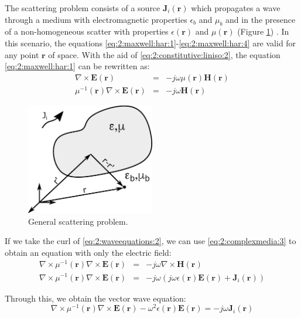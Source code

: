 		The scattering problem consists of a source $\mathbf{J}_i(\mathbf{r})$ which propagates a wave through a medium with electromagnetic properties $\epsilon_b$ and $\mu_b$ and in the presence of a non-homogeneous scatter with properties $\epsilon(\mathbf{r})$ and $\mu(\mathbf{r})$ (Figure \ref{fig:2:scattering}) \citep{chew1995}. In this scenario, the equations \eqref{eq:2:maxwell:har:1}-\eqref{eq:2:maxwell:har:4} are valid for any point $\mathbf{r}$ of space. With the aid of \eqref{eq:2:constitutive:liniso:2}, the equation \eqref{eq:2:maxwell:har:1} can be rewritten as:
		\begin{eqnarray}
				\nabla\times\mathbf{E}(\mathbf{r}) &=& - j\omega\mu(\mathbf{r})\mathbf{H}(\mathbf{r}) \label{eq:2:waveequations:1} \\
				\mu^{-1}(\mathbf{r})\nabla\times\mathbf{E}(\mathbf{r}) &=& - j\omega\mathbf{H}(\mathbf{r}) \label{eq:2:waveequations:2} 
		\end{eqnarray}
	
	    \begin{figure}[!tb]
			\centering
			\includegraphics[width=0.5\textwidth]{./figuras/scattering}
			\caption{General scattering problem.}
			\label{fig:2:scattering}
		\end{figure}
	
		If we take the curl of \eqref{eq:2:waveequations:2}, we can use \eqref{eq:2:complexmedia:3} to obtain an equation with only the electric field:
		\begin{eqnarray}
			\nabla\times\mu^{-1}(\mathbf{r})\nabla\times\mathbf{E}(\mathbf{r}) &=& - j\omega\nabla\times\mathbf{H}(\mathbf{r}) \label{eq:2:waveequations:3} \\ \nabla\times\mu^{-1}(\mathbf{r})\nabla\times\mathbf{E}(\mathbf{r}) &=& - j\omega\left(j\omega\epsilon(\mathbf{r})\mathbf{E}(\mathbf{r}) +  \mathbf{J}_i(\mathbf{r})\right) \label{eq:2:waveequations:4}
		\end{eqnarray}
	
		Through this, we obtain the vector wave equation:
		\begin{equation}
					\nabla\times\mu^{-1}(\mathbf{r})\nabla\times\mathbf{E}(\mathbf{r}) - \omega^2\epsilon(\mathbf{r})\mathbf{E}(\mathbf{r})  = - j\omega\mathbf{J}_i(\mathbf{r}) \label{eq:2:waveequations:5} 
		\end{equation}
	
